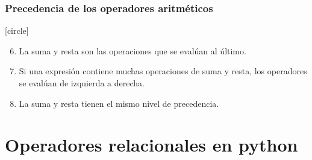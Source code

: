 \documentclass[12pt]{beamer}
\begin{document}
{\begin{frame}
\begin{enumerate}[<+->]
\end{enumerate}
\end{frame}
\begin{frame}
\frametitle{Precedencia de los operadores aritméticos}
[circle]
\begin{enumerate}[<+->]
\setcounter{enumi}{5}
\item La suma y resta son las operaciones que se evalúan al último. 
\item Si una expresión contiene muchas operaciones de suma y resta, los operadores se evalúan de izquierda a derecha.
\item La suma y resta tienen el mismo nivel de precedencia.
\end{enumerate}
\end{frame}
\section{Operadores relacionales en python}
}
\end{document}
